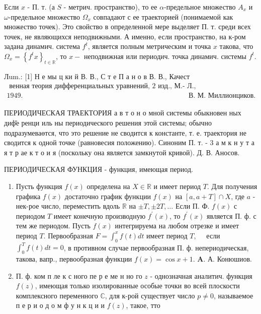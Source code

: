 \documentclass[10pt]{article}
\begin{document}
Если $x$ - П. т. (а $S$ - метрич. пространство), то ее $\alpha$-предельное множество $A_{x}$ и $\omega$-предельное множество $\Omega_{x}$ совпадают с ее траекторией (понимаемой как множество точек). Это свойство в определенной мере выделяет П. т. среди всех точек, не являющихся неподвижными. А именно, если пространство, на к-ром задана динамич. система $f^{t}$, является полным метрическим и точка $x$ такова, что $\Omega_{x}=\left\{f^{t} x\right\}_{t \in \mathbb{R}}$, то $x-$ неподвижная или периодич. точка динамич. системы $f^{t}$.



Лum.: [1] Н е мы ц ки й В. В., С т е П а н о в В. В., Качест$\begin{array}{ll}\text { венная теория дифференциальных уравнений, } 2 \text { изд., М.- Л., } \\ 1949 . & \text { В. М. Миллионциков. }\end{array}$



ПЕРИОДИЧЕСКАЯ ТРАЕКТОРИЯ а в т $о$ н $о$ мной системы обыкновен ных диф̆е ренци иль ны периодического решения этой системы; обычно подразумеваөтся, что это решение не сводится к константе, т. е. траектория не сводится к одной точке (равновесия положению). Синоним П. т. - 3 а м к н у т а я т р ае к т о и я (поскольку она является замкнутой кривой). Д. В. Аносов.



ПЕРИОДИЧЕСКАЯ ФУНКЦИЯ - функция, имеющая период.



\begin{enumerate}

  \item Пусть функция $f(x)$ определена на $X \in \mathbb{R}$ и имеет период $T$. Для получения графика $f(x)$ достаточно график функции $f(x)$ на $[a, a+T] \cap X$, где $a$ - нек-рое число, переместить вдоль $\mathbb{R}$ на $\pm T, \pm 2 T, \ldots$ Если П. Ф. $f(x)$ с периодом $T$ имеет конечную производную $f^{\prime}(x)$, то $f^{\prime}(x)$ является П. ф. с тем же периодом. Пусть $f(x)$ интегрируема на любом отрезке и имеет период $T$. Первообразная $F=\int_{0}^{x} f(t) d t$ имеет период $T, \quad$ если $\int_{0}^{T} f(t) d t=0$, в противном случае первообразная П. ф. непериодическая, такова, вапр., первообразная функции $f(x)=\cos x+1$. $\boldsymbol{A}$. $А$. Конюшиов.



  \item П. ф. ком п ле к с ного пе р е ме н но го $z$ - однозначная аналитич. функция $f(z)$, имеющая только изолированные особые точки во всей плоскости комплексного переменного $\mathbb{C}$, для к-рой существует число $p \neq 0$, называемое п е р и о д о м ф у н к ц и и $f(z)$, такое, тто



\end{enumerate}
\end{document}
